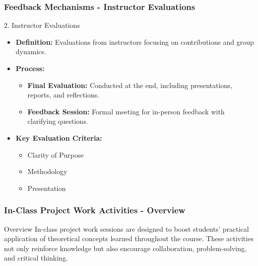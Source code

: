 \documentclass[aspectratio=169]{beamer}
\begin{document}
\begin{frame}[fragile]
  \frametitle{Feedback Mechanisms - Instructor Evaluations}
  \begin{block}{2. Instructor Evaluations}
    \begin{itemize}
      \item \textbf{Definition:} Evaluations from instructors focusing on contributions and group dynamics.
    
      \item \textbf{Process:}
      \begin{itemize}
        \item \textbf{Final Evaluation:} Conducted at the end, including presentations, reports, and reflections.
        \item \textbf{Feedback Session:} Formal meeting for in-person feedback with clarifying questions.
      \end{itemize}

      \item \textbf{Key Evaluation Criteria:}
      \begin{itemize}
        \item Clarity of Purpose
        \item Methodology
        \item Presentation
      \end{itemize}
    \end{itemize}
  \end{block}
\end{frame}

\begin{frame}[fragile]
  \frametitle{In-Class Project Work Activities - Overview}
  \begin{block}{Overview}
    In-class project work sessions are designed to boost students' practical application of theoretical concepts learned throughout the course. 
    These activities not only reinforce knowledge but also encourage collaboration, problem-solving, and critical thinking.
  \end{block}
\end{frame}
\end{document}
